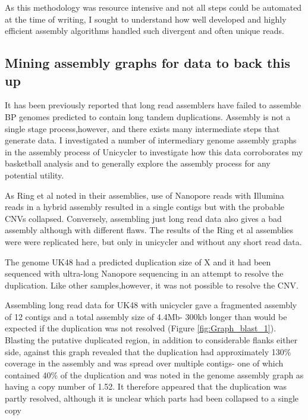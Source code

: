 \documentclass{article}
\begin{document}
As this methodology was resource intensive and not all steps could be automated at the time of writing, I sought to understand how well developed and highly efficient assembly algorithms handled such divergent and often unique reads.


\subsection{Mining assembly graphs for data to back this up}

It has been previously reported that long read assemblers have failed to assemble BP genomes predicted to contain long tandem duplications. Assembly is not a single stage process,however, and there exists many intermediate steps that generate data. I investigated a number of intermediary genome assembly graphs in the assembly process of Unicycler to investigate how this data corroborates my basketball analysis and to generally explore the assembly process for any potential utility.

As Ring et al noted in their assemblies, use of Nanopore reads with Illumina reads in a hybrid assembly resulted in a single contigs but with the probable CNVs collapsed. Conversely, assembling just long read data also gives a bad assembly although with different flaws. The results of the Ring et al assemblies were were replicated here, but only in unicycler and without any short read data.




The genome UK48 had a predicted duplication size of X and it had been sequenced with ultra-long Nanopore sequencing in an attempt to resolve the duplication. Like other samples,however, it was not possible to resolve the CNV.

Assembling long read data for UK48 with unicycler gave a fragmented assembly of 12 contigs and a total assembly size of 4.4Mb- 300kb longer than would be expected if the duplication was not resolved (Figure \ref{fig:Graph_blast_1}). Blasting the putative duplicated region, in addition to considerable flanks either side, against this graph revealed that the duplication had approximately 130\% coverage in the assembly and was spread over multiple contigs- one of which contained 40\% of the duplication and was noted in the genome assembly graph as having a copy number of 1.52. It therefore appeared that the duplication was partly resolved, although it is unclear which parts had been collapsed to a single copy
\end{document}
